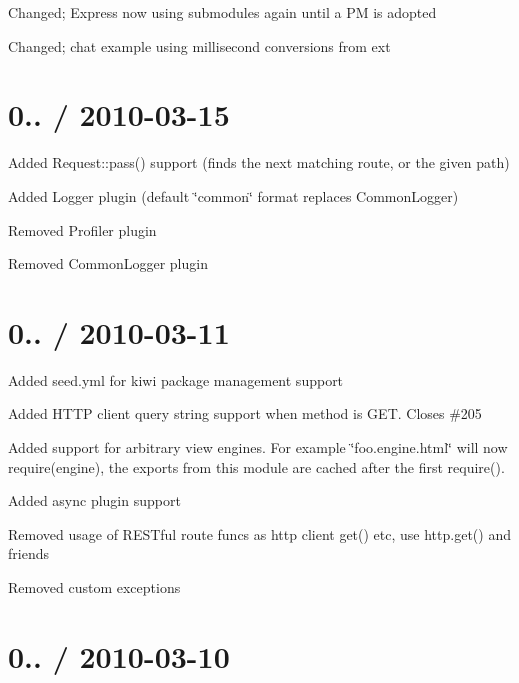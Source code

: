 {\ttfamily }

{\ttfamily 
\begin{DoxyItemize}
\item Changed; Express now using submodules again until a PM is adopted
\item Changed; chat example using millisecond conversions from ext
\end{DoxyItemize}}

{\ttfamily \section*{0.. / 2010-\/03-\/15 }}

{\ttfamily }

{\ttfamily 
\begin{DoxyItemize}
\item Added Request\+::pass() support (finds the next matching route, or the given path)
\item Added Logger plugin (default \char`\"{}common\char`\"{} format replaces Common\+Logger)
\item Removed Profiler plugin
\item Removed Common\+Logger plugin
\end{DoxyItemize}}

{\ttfamily \section*{0.. / 2010-\/03-\/11 }}

{\ttfamily }

{\ttfamily 
\begin{DoxyItemize}
\item Added seed.\+yml for kiwi package management support
\item Added H\+T\+TP client query string support when method is G\+ET. Closes \#205
\item Added support for arbitrary view engines. For example \char`\"{}foo.\+engine.\+html\char`\"{} will now require(\textquotesingle{}engine\textquotesingle{}), the exports from this module are cached after the first require().
\item Added async plugin support
\item Removed usage of R\+E\+S\+Tful route funcs as http client get() etc, use http.\+get() and friends
\item Removed custom exceptions
\end{DoxyItemize}}

{\ttfamily \section*{0.. / 2010-\/03-\/10 }}

